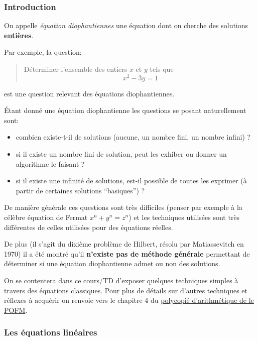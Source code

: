 
\subsubsection{Introduction}

On appelle \emph{équation diophantiennes} une équation dont on cherche des solutions \textbf{entières}.

Par exemple, la question:
\begin{quote}
  Déterminer l'ensemble des entiers \(x\) et
  \(y\) tels que $$x^2-3 y = 1$$
\end{quote}
est une question relevant des équations
diophantiennes.

Étant donné une équation diophantienne les questions se posant
naturellement sont:

\begin{itemize}
  \item  combien existe-t-il de solutions (aucune, un nombre fini, un nombre
        infini) ?
  \item  si il existe un nombre fini de solution, peut les exhiber ou donner un
        algorithme le faisant ?
  \item  si il existe une infinité de solutions, est-il possible de toutes les
        exprimer (à partir de certaines solutions ``basiques'') ?
\end{itemize}

De manière générale ces questions sont très difficiles (penser par
exemple à la célèbre équation de Fermat \(x^n+y^n=z^n\)) et les
techniques utilisées sont très différentes de celles utilisées pour des
équations réelles.

De plus (il s'agit du dixième problème de Hilbert, résolu par
Matiassevitch en 1970) il a été montré qu'il \textbf{n'existe pas de
  méthode générale} permettant de déterminer si une équation diophantienne
admet ou non des solutions.



On se contentera dans ce cours/TD d'exposer quelques techniques simples
à travers des équations classiques. Pour plus de détails sur d'autres
techniques et réflexes à acquérir on renvoie vers le chapitre 4 du
\href{https://maths-olympiques.fr/wp-content/uploads/2017/09/arith_cours.pdf}{polycopié d'arithmétique de le POFM}.


\subsubsection{Les équations linéaires}

